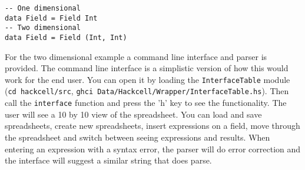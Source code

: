 \documentclass{article}
\begin{document}
\begin{verbatim}
-- One dimensional
data Field = Field Int
-- Two dimensional
data Field = Field (Int, Int)
\end{verbatim}
	For the two dimensional example a command line interface and parser is provided. The command line interface is a simplistic version of how this would work for the end user. You can open it by loading the \texttt{InterfaceTable} module (\texttt{cd hackcell/src}, \texttt{ghci Data/Hackcell/Wrapper/InterfaceTable.hs}). Then call the \texttt{interface} function and press the 'h' key to see the functionality. The user will see a 10 by 10 view of the spreadsheet. You can load and save spreadsheets, create new spreadsheets, insert expressions on a field, move through the spreadsheet and switch between seeing expressions and results. When entering an expression with a syntax error, the parser will do error correction and the interface will suggest a similar string that does parse.
\end{document}
